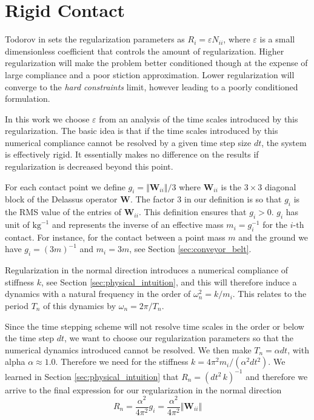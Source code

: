 \section{Rigid Contact}

Todorov in \cite{bib:todorov2014} sets the regularization parameters as
$R_i=\varepsilon N_{ii}$, where $\varepsilon$ is a small dimensionless
coefficient that controls the amount of regularization. Higher regularization
will make the problem better conditioned though at the expense of large
compliance and a poor stiction approximation. Lower regularization will converge
to the \textit{hard constraints} limit, however leading to a poorly conditioned
formulation. 

In this work we choose $\varepsilon$ from an analysis of the time scales
introduced by this regularization. The basic idea is that if the time scales
introduced by this numerical compliance cannot be resolved by a given time step
size $dt$, the system is effectively rigid. It essentially makes no difference
on the results if regularization is decreased beyond this point. 

For each contact point we define $g_i=\Vert\mathbf{W}_{ii}\Vert/3$ where
$\mathbf{W}_{ii}$ is the $3\times 3$ diagonal block of the Delassus operator
$\mathbf{W}$. The factor $3$ in our definition is so that $g_i$ is the RMS value
of the entries of $\mathbf{W}_{ii}$. This definition ensures that $g_i > 0$.
$g_i$ has unit of $\text{kg}^{-1}$ and represents the inverse of an effective
mass $m_i=g_i^{-1}$ for the $i\text{-th}$ contact. For instance, for the contact
between a point mass $m$ and the ground we have $g_i=(3m)^{-1}$ and $m_i=3m$,
see Section \ref{sec:conveyor_belt}. 

Regularization in the normal direction introduces a numerical compliance of
stiffness $k$, see Section \ref{sec:physical_intuition}, and this will therefore
induce a dynamics with a natural frequency in the order of $\omega_n^2=k/m_i$.
This relates to the period $T_n$ of this dynamics by $\omega_n=2\pi/T_n$.

Since the time stepping scheme will not resolve time scales in the order or
below the time step $dt$, we want to choose our regularization parameters so
that the numerical dynamics introduced cannot be resolved. We then make $T_n =
\alpha dt$, with alpha $\alpha \approx 1.0$. Therefore we need for the stiffness
$k=4\pi^2m_i/(\alpha^2 dt^2)$. We learned in Section
\ref{sec:physical_intuition} that $R_n=(dt^2\,k)^{-1}$ and therefore we arrive
to the final expression for our regularization in the normal direction
\begin{equation}
	R_n = \frac{\alpha^2}{4\pi^2}g_i = \frac{\alpha^2}{4\pi^2}\Vert\mathbf{W}_{ii}\Vert
\end{equation}

